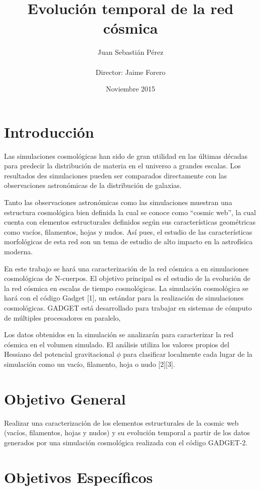 \documentclass{article}
\title{Evoluci\'on temporal de la red c\'osmica}
\author{Juan Sebastián Pérez\\ \\Director: Jaime Forero}
\date{Noviembre 2015}
\begin{document}
\maketitle

\section{Introducción}

Las simulaciones cosmológicas han sido de gran utilidad en 
las últimas décadas para predecir la distribuci\'on de materia 
en el universo a grandes escalas.
Los resultados des simulaciones pueden ser comparados
directamente con las observaciones astron\'omicas de la distribuci\'on
de galaxias. 

Tanto las observaciones astronómicas como las simulaciones muestran
una estructura cosmológica bien definida la cual se conoce como
“cosmic web”, la cual cuenta con elementos 
estructurales definidos según sus características geométricas como
vacíos, filamentos, hojas y nudos.  
Así pues, el estudio de las  características morfológicas de esta red
son un tema de estudio de alto impacto en la astrofísica moderna. 

En este trabajo se har\'a una caracterización de la red c\'osmica a
en simulaciones cosmológicas de N-cuerpos. 
El objetivo principal es el estudio de la evoluci\'on de la red
c\'osmica en escalas de tiempo cosmol\'ogicas.
La simulación cosmol\'ogica se hará con el c\'odigo Gadget [1], 
un estándar para la realización de simulaciones cosmológicas. GADGET
est\'a desarrollado para trabajar en sistemas de cómputo de múltiples
procesadores en paralelo, 


Los datos obtenidos en la simulación se analizar\'an para caracterizar
la red c\'osmica en el volumen simulado. 
El an\'alisis  utiliza los valores propios del Hessiano del potencial
gravitacional $\phi$ para clasificar localmente cada lugar de la
simulaci\'on como un vac\'io, filamento, hoja o nudo [2][3]. 


\section{Objetivo General}

Realizar una caracterización de los elementos estructurales de la
cosmic web (vacíos, filamentos, hojas y nudos) y su evolución temporal
a partir de los datos generados por una simulación cosmológica
realizada con el código GADGET-2.  


\section{Objetivos Específicos}
\end{document}
